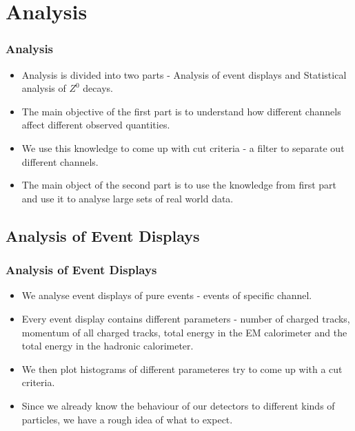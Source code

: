 \documentclass[10pt]{beamer}
\begin{document}
\section{Analysis}
\begin{frame}
\frametitle{Analysis}
\begin{itemize}
  \item Analysis is divided into two parts - Analysis of event displays and Statistical analysis of $Z^0$ decays. 
  \item The main objective of the first part is to understand how different channels affect different observed quantities.
  \item We use this knowledge to come up with cut criteria - a filter to separate out different channels.
  \item The main object of the second part is to use the knowledge from first part and use it to analyse large sets of real world data.
\end{itemize}
\end{frame}

\subsection{Analysis of Event Displays}
\begin{frame}
\frametitle{Analysis of Event Displays}
\begin{itemize}
  \item We analyse event displays of pure events - events of specific channel.
  \item Every event display contains different parameters - number of charged tracks, momentum of all charged tracks, total energy in the EM calorimeter and the total energy in the hadronic calorimeter.
  \item We then plot histograms of different parameteres try to come up with a cut criteria.
  \item Since we already know the behaviour of our detectors to different kinds of particles, we have a rough idea of what to expect.
\end{itemize}
\end{frame}
\end{document}
